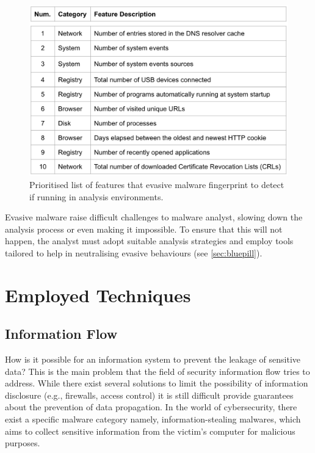 \documentclass[LaM,binding=0.6cm]{sapthesis}
\begin{document}
\begin{figure}[h!]
\centering
\includegraphics[scale=.5]{images/background5}
\caption{Prioritised list of features that evasive malware fingerprint to detect if running in analysis environments\cite{miramirkhani2017spotless}.}
\end{figure}
Evasive malware raise difficult challenges to malware analyst, slowing down the analysis process or even making it impossible. To ensure that this will not happen, the analyst must adopt suitable analysis strategies and employ tools tailored to help in neutralising evasive behaviours (see \autoref{sec:bluepill}).

\chapter{Employed Techniques}
\label{ch:chapter2}

\section{Information Flow}
\label{sec:informationflow}
How is it possible for an information system to prevent the leakage of sensitive data? This is the main problem that the field of security information flow tries to address. While there exist several solutions to limit the possibility of information disclosure (e.g., firewalls, access control) it is still difficult provide guarantees about the prevention of data propagation. In the world of cybersecurity, there exist a specific malware category namely, information-stealing malwares, which aims to collect sensitive information from the victim's computer for malicious purposes.\\
\end{document}
